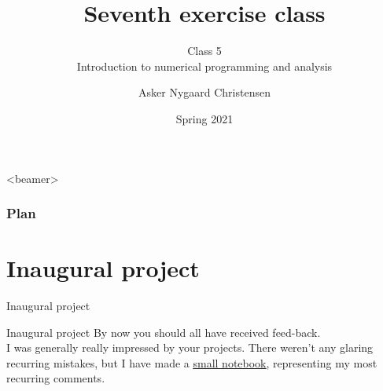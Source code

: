 \documentclass[10pt,danish,t,10pt]{beamer}
\title{Seventh exercise class \vspace{-2mm}}
\subtitle{Class 5 \\Introduction to numerical programming and analysis \vspace{-4mm} }
\author{Asker Nygaard Christensen}
\date{Spring 2021}
\makeatletter
\let\origtableofcontents=\tableofcontents
\def\tableofcontents{\@ifnextchar[{\origtableofcontents}{\gobbletableofcontents}}
\def\gobbletableofcontents#1{\origtableofcontents}
\makeatother
\begin{document}
{
\begin{frame}

\maketitle


\end{frame}
}

\addtocounter{framenumber}{-1}

\begin{frame}<beamer>
\frametitle{Plan}

\tableofcontents[]
\end{frame}

\section{Inaugural project}
\begin{frame}{Inaugural project}
\vspace{2cm}
\begin{alertblock}{Inaugural project}
    By now you should all have received feed-back. \\
    I was generally really impressed by your projects. There weren't any glaring recurring mistakes, but I have made a \href{https://github.com/AskerNC/Teaching_notes/blob/master/Inauguralproject2021.ipynb}{\underline{small notebook}}, representing my most recurring comments.
\end{alertblock}
    
\end{frame}
\end{document}
